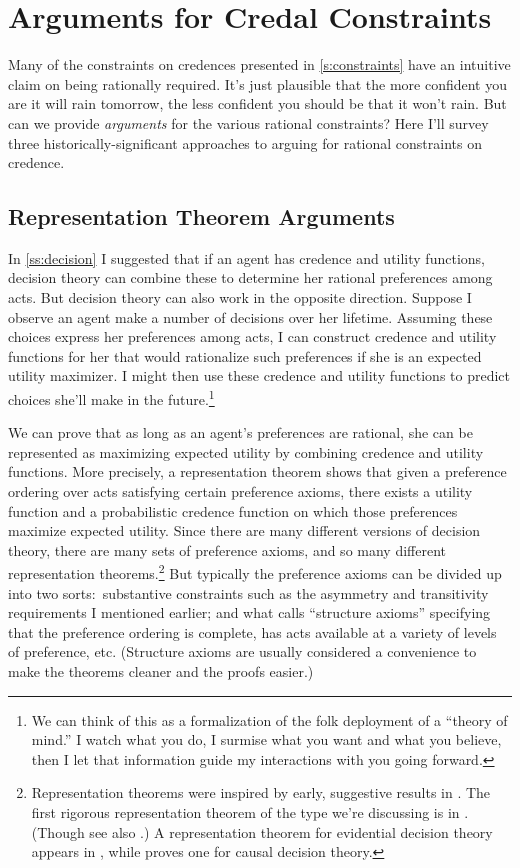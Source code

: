 \section{Arguments for Credal Constraints}
Many of the constraints on credences presented in \autoref{s:constraints} have an intuitive claim on being rationally required. It's just plausible that the more confident you are it will rain tomorrow, the less confident you should be that it won't rain. But can we provide \emph{arguments} for the various rational constraints? Here I'll survey three historically-significant approaches to arguing for rational constraints on credence.

\subsection{Representation Theorem Arguments} \label{ss:representation}
In \autoref{ss:decision} I suggested that if an agent has credence and utility functions, decision theory can combine these to determine her rational preferences among acts. But decision theory can also work in the opposite direction. Suppose I observe an agent make a number of decisions over her lifetime. Assuming these choices express her preferences among acts, I can construct credence and utility functions for her that would rationalize such preferences if she is an expected utility maximizer. I might then use these credence and utility functions to predict choices she'll make in the future.\footnote
{We can think of this as a formalization of the folk deployment of a ``theory of mind.'' I watch what you do, I surmise what you want and what you believe, then I let that information guide my interactions with you going forward.}

We can prove that as long as an agent's preferences are rational, she can be represented as maximizing expected utility by combining credence and utility functions. More precisely, a representation theorem shows that given a preference ordering over acts satisfying certain preference axioms, there exists a utility function and a probabilistic credence function on which those preferences maximize expected utility. Since there are many different versions of decision theory, there are many sets of preference axioms, and so many different representation theorems.\footnote
{Representation theorems were inspired by early, suggestive results in \citet{RamseyTruth}. The first rigorous representation theorem of the type we're discussing is in \citet{SavageFoundations}. (Though see also \citealp{vonNeumannMorgenstern}.) A representation theorem for evidential decision theory appears in \citet{JeffreyLogic}, while \citet{JoyceCausal} proves one for causal decision theory.}
 But typically the preference axioms can be divided up into two sorts:\ substantive constraints such as the asymmetry and transitivity requirements I mentioned earlier; and what \citet{SuppesMetaphysics} calls ``structure axioms'' specifying that the preference ordering is complete, has acts available at a variety of levels of preference, etc. (Structure axioms are usually considered a convenience to make the theorems cleaner and the proofs easier.)


